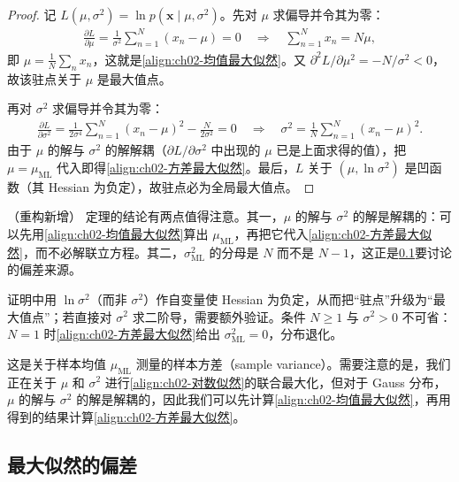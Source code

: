 \documentclass[../../main.tex]{subfiles}
\begin{document}
\begin{proof}
记 $L(\mu,\sigma^{2})=\ln p(\mathbf{x}\mid\mu,\sigma^{2})$。先对 $\mu$ 求偏导并令其为零：
\begin{align*}
  \frac{\partial L}{\partial\mu} = \frac{1}{\sigma^{2}}\sum_{n=1}^{N}(x_n-\mu) = 0
  \quad\Longrightarrow\quad
  \sum_{n=1}^{N}x_n = N\mu ,
\end{align*}
即 $\mu=\frac{1}{N}\sum_n x_n$，这就是\eqref{align:ch02-均值最大似然}。又 $\partial^{2}L/\partial\mu^{2}=-N/\sigma^{2}<0$，故该驻点关于 $\mu$ 是最大值点。

再对 $\sigma^{2}$ 求偏导并令其为零：
\begin{align*}
  \frac{\partial L}{\partial\sigma^{2}} = \frac{1}{2\sigma^{4}}\sum_{n=1}^{N}(x_n-\mu)^{2} - \frac{N}{2\sigma^{2}} = 0
  \quad\Longrightarrow\quad
  \sigma^{2} = \frac{1}{N}\sum_{n=1}^{N}(x_n-\mu)^{2} .
\end{align*}
由于 $\mu$ 的解与 $\sigma^{2}$ 的解解耦（$\partial L/\partial\sigma^{2}$ 中出现的 $\mu$ 已是上面求得的值），把 $\mu=\mu_{\mathrm{ML}}$ 代入即得\eqref{align:ch02-方差最大似然}。最后，$L$ 关于 $(\mu,\ln\sigma^{2})$ 是凹函数（其 Hessian 为负定），故驻点必为全局最大值点。
\end{proof}

\begin{remark}（重构新增）
定理的结论有两点值得注意。其一，$\mu$ 的解与 $\sigma^{2}$ 的解是解耦的：可以先用\eqref{align:ch02-均值最大似然}算出 $\mu_{\mathrm{ML}}$，再把它代入\eqref{align:ch02-方差最大似然}，而不必解联立方程。其二，$\sigma_{\mathrm{ML}}^{2}$ 的分母是 $N$ 而不是 $N-1$，这正是\cref{subsection:ch02-最大似然的偏差}要讨论的偏差来源。

证明中用 $\ln\sigma^{2}$（而非 $\sigma^{2}$）作自变量使 Hessian 为负定，从而把“驻点”升级为“最大值点”；若直接对 $\sigma^{2}$ 求二阶导，需要额外验证。条件 $N\geqslant1$ 与 $\sigma^{2}>0$ 不可省：$N=1$ 时\eqref{align:ch02-方差最大似然}给出 $\sigma_{\mathrm{ML}}^{2}=0$，分布退化。
\end{remark}

这是关于样本均值 $\mu_{\mathrm{ML}}$ 测量的样本方差（sample variance）。需要注意的是，我们正在关于 $\mu$ 和 $\sigma^{2}$ 进行\eqref{align:ch02-对数似然}的联合最大化，但对于 Gauss 分布，$\mu$ 的解与 $\sigma^{2}$ 的解是解耦的，因此我们可以先计算\eqref{align:ch02-均值最大似然}，再用得到的结果计算\eqref{align:ch02-方差最大似然}。

\subsection{最大似然的偏差}\label{subsection:ch02-最大似然的偏差}
\end{document}
